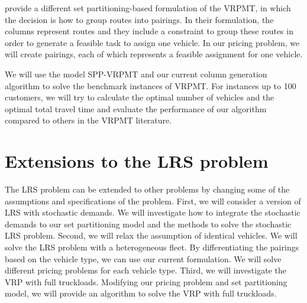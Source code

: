\citet{Olivera} provide a different set partitioning-based formulation of the VRPMT, 
in which the decision is how to group routes into pairings. In their formulation,
the columns represent routes and they include a constraint to group these routes 
in order to generate a feasible task to assign one vehicle. In our pricing problem, 
we will create pairings, each of which represents a feasible assignment for one vehicle.

We will use the model SPP-VRPMT and our current column generation algorithm 
to solve the benchmark instances of VRPMT. For instances up to 100 customers, we 
will try to calculate the optimal number 
of vehicles and the optimal total travel time and evaluate the performance
of our algorithm compared to others in the VRPMT literature.

\section{Extensions to the LRS problem}
\label{extentions}

The LRS problem can be extended to other problems by changing some of the 
assumptions and specifications of the problem. 
First, we will consider a version of LRS with stochastic demands. 
We will investigate how to integrate the stochastic demands to our set partitioning 
model and the methods to solve the stochastic LRS problem. 
Second, we will relax the 
assumption of identical vehicles. We will solve the LRS problem with 
a heterogeneous fleet. By differentiating the pairings based on the vehicle
type, we can use our current formulation. We will solve different pricing problems
for each vehicle type. 
Third, we will investigate the VRP with full truckloads. Modifying our
pricing problem and set partitioning model, we will provide an algorithm to solve 
the VRP with full truckloads. 


